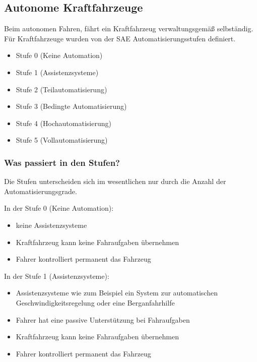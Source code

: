 \subsection{Autonome Kraftfahrzeuge}
Beim autonomen Fahren, fährt ein Kraftfahrzeug verwaltungsgemäß selbständig.
Für Kraftfahrzeuge wurden von der \ac{SAE} Automatisierungsstufen definiert\cite{PRACTICE}.
\begin{itemize}
	\item Stufe 0 (Keine Automation)
	\item Stufe 1 (Assistenzsysteme)
	\item Stufe 2 (Teilautomatisierung)
	\item Stufe 3 (Bedingte Automatisierung)
	\item Stufe 4 (Hochautomatisierung)
	\item Stufe 5 (Vollautomatisierung)
\end{itemize}
\subsubsection{Was passiert in den Stufen?}
Die Stufen unterscheiden sich im wesentlichen nur durch die Anzahl der Automatisierungsgrade.

\vspace{0.5cm}

In der Stufe 0 (Keine Automation):
\begin{itemize}
	\item keine Assistenzsysteme
	\item Kraftfahrzeug kann keine Fahraufgaben übernehmen
	\item Fahrer kontrolliert permanent das Fahrzeug
\end{itemize}

\vspace{0.5cm}

\newpage

In der Stufe 1 (Assistenzsysteme):
\begin{itemize}
	\item Assistenzsysteme wie zum Beispiel ein System zur automatischen Geschwindigkeitsregelung oder eine Berganfahrhilfe
	\item Fahrer hat eine passive Unterstützung bei Fahraufgaben
	\item Kraftfahrzeug kann keine Fahraufgaben übernehmen
	\item Fahrer kontrolliert permanent das Fahrzeug
\end{itemize}

\vspace{0.5cm}

